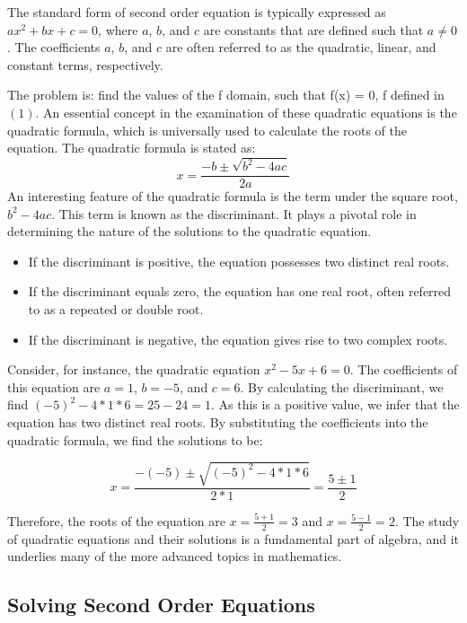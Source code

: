 \documentclass[12pt]{article}
\begin{document}
 The standard form of second order equation is typically expressed as $ax^2 + bx + c = 0$, where $a$, $b$, and $c$ are constants that are defined such that $a \neq 0$. The coefficients $a$, $b$, and $c$ are often referred to as the quadratic, linear, and constant terms, respectively. 

The problem is: find the values of the f domain, such that f(x) = 0, f defined in $(1)$. An essential concept in the examination of these quadratic equations is the quadratic formula, which is universally used to calculate the roots of the equation. The quadratic formula is stated as:
\begin{equation}
x = \frac{-b \pm \sqrt{b^2 - 4ac}}{2a}
\end{equation}
An interesting feature of the quadratic formula is the term under the square root, $b^2 - 4ac$. This term is known as the discriminant. It plays a pivotal role in determining the nature of the solutions to the quadratic equation.

\begin{itemize}
    \item If the discriminant is positive, the equation possesses two distinct real roots.
    \item If the discriminant equals zero, the equation has one real root, often referred to as a repeated or double root.
    \item If the discriminant is negative, the equation gives rise to two complex roots.
\end{itemize}

Consider, for instance, the quadratic equation $x^2 - 5x + 6 = 0$. The coefficients of this equation are $a=1$, $b=-5$, and $c=6$. By calculating the discriminant, we find $(-5)^2 - 4*1*6 = 25 - 24 = 1$. As this is a positive value, we infer that the equation has two distinct real roots. By substituting the coefficients into the quadratic formula, we find the solutions to be:

\[x = \frac{-(-5) \pm \sqrt{(-5)^2 - 4*1*6}}{2*1} = \frac{5 \pm 1}{2}\]

Therefore, the roots of the equation are $x = \frac{5 + 1}{2} = 3$ and $x = \frac{5 - 1}{2} = 2$. The study of quadratic equations and their solutions is a fundamental part of algebra, and it underlies many of the more advanced topics in mathematics.
\subsection{Solving Second Order Equations}
\end{document}
